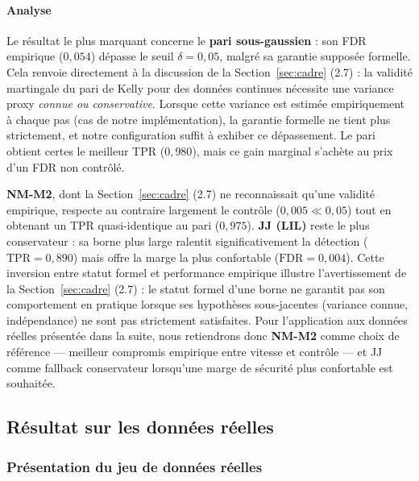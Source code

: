 \documentclass[10.5pt,a4paper]{article}
\begin{document}
\paragraph{Analyse} Le résultat le plus marquant concerne le \textbf{pari
sous-gaussien} : son FDR empirique ($0{,}054$) dépasse le seuil
$\delta=0{,}05$, malgré sa garantie supposée formelle. Cela renvoie
directement à la discussion de la Section~\ref{sec:cadre} (2.7) : la
validité martingale du pari de Kelly pour des données continues nécessite
une variance proxy \emph{connue ou conservative}. Lorsque cette variance
est estimée empiriquement à chaque pas (cas de notre implémentation), la
garantie formelle ne tient plus strictement, et notre configuration
suffit à exhiber ce dépassement. Le pari obtient certes le meilleur TPR
($0{,}980$), mais ce gain marginal s'achète au prix d'un FDR non
contrôlé.

\textbf{NM-M2}, dont la Section~\ref{sec:cadre} (2.7) ne reconnaissait
qu'une validité empirique, respecte au contraire largement le contrôle
($0{,}005 \ll 0{,}05$) tout en obtenant un TPR quasi-identique au pari
($0{,}975$). \textbf{JJ (LIL)} reste le plus conservateur : sa borne
plus large ralentit significativement la détection ($\text{TPR}=0{,}890$)
mais offre la marge la plus confortable ($\text{FDR}=0{,}004$).
Cette inversion entre statut formel et performance empirique illustre
l'avertissement de la Section~\ref{sec:cadre} (2.7) : le statut formel
d'une borne ne garantit pas son comportement en pratique lorsque ses
hypothèses sous-jacentes (variance connue, indépendance) ne sont pas
strictement satisfaites. Pour l'application aux données réelles
présentée dans la suite, nous retiendrons donc \textbf{NM-M2} comme
choix de référence — meilleur compromis empirique entre vitesse et
contrôle — et JJ comme fallback conservateur lorsqu'une marge de
sécurité plus confortable est souhaitée.



\subsection{Résultat sur les données réelles}

\subsubsection{Présentation du jeu de données réelles}
\end{document}
